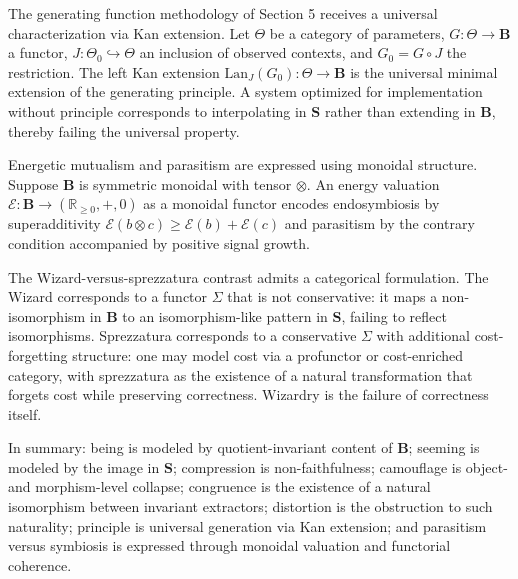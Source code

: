\documentclass[11pt]{article}
\begin{document}
The generating function methodology of Section 5 receives a universal characterization via Kan extension. Let $\Theta$ be a category of parameters, $G : \Theta \to \mathbf{B}$ a functor, $J : \Theta_0 \hookrightarrow \Theta$ an inclusion of observed contexts, and $G_0 = G \circ J$ the restriction. The left Kan extension $\mathrm{Lan}_J(G_0) : \Theta \to \mathbf{B}$ is the universal minimal extension of the generating principle. A system optimized for implementation without principle corresponds to interpolating in $\mathbf{S}$ rather than extending in $\mathbf{B}$, thereby failing the universal property.

Energetic mutualism and parasitism are expressed using monoidal structure. Suppose $\mathbf{B}$ is symmetric monoidal with tensor $\otimes$. An energy valuation $\mathcal{E} : \mathbf{B} \to (\mathbb{R}_{\ge 0}, +, 0)$ as a monoidal functor encodes endosymbiosis by superadditivity $\mathcal{E}(b \otimes c) \ge \mathcal{E}(b) + \mathcal{E}(c)$ and parasitism by the contrary condition accompanied by positive signal growth.

The Wizard-versus-sprezzatura contrast admits a categorical formulation. The Wizard corresponds to a functor $\Sigma$ that is not conservative: it maps a non-isomorphism in $\mathbf{B}$ to an isomorphism-like pattern in $\mathbf{S}$, failing to reflect isomorphisms. Sprezzatura corresponds to a conservative $\Sigma$ with additional cost-forgetting structure: one may model cost via a profunctor or cost-enriched category, with sprezzatura as the existence of a natural transformation that forgets cost while preserving correctness. Wizardry is the failure of correctness itself.

In summary: being is modeled by quotient-invariant content of $\mathbf{B}$; seeming is modeled by the image in $\mathbf{S}$; compression is non-faithfulness; camouflage is object- and morphism-level collapse; congruence is the existence of a natural isomorphism between invariant extractors; distortion is the obstruction to such naturality; principle is universal generation via Kan extension; and parasitism versus symbiosis is expressed through monoidal valuation and functorial coherence.
\end{document}

